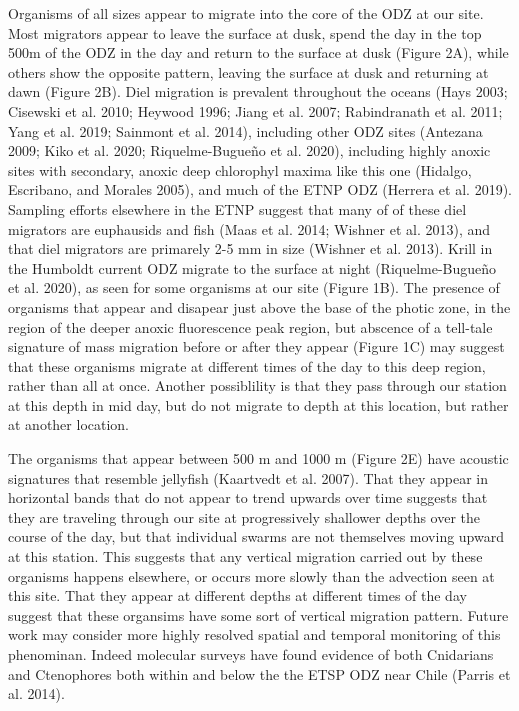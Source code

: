 \documentclass[]{article}
\begin{document}
Organisms of all sizes appear to migrate into the core of the ODZ at our
site. Most migrators appear to leave the surface at dusk, spend the day
in the top 500m of the ODZ in the day and return to the surface at dusk
(Figure 2A), while others show the opposite pattern, leaving the surface
at dusk and returning at dawn (Figure 2B). Diel migration is prevalent
throughout the oceans (Hays 2003; Cisewski et al. 2010; Heywood 1996;
Jiang et al. 2007; Rabindranath et al. 2011; Yang et al. 2019; Sainmont
et al. 2014), including other ODZ sites (Antezana 2009; Kiko et al.
2020; Riquelme-Bugueño et al. 2020), including highly anoxic sites with
secondary, anoxic deep chlorophyl maxima like this one (Hidalgo,
Escribano, and Morales 2005), and much of the ETNP ODZ (Herrera et al.
2019). Sampling efforts elsewhere in the ETNP suggest that many of of
these diel migrators are euphausids and fish (Maas et al. 2014; Wishner
et al. 2013), and that diel migrators are primarely 2-5 mm in size
(Wishner et al. 2013). Krill in the Humboldt current ODZ migrate to the
surface at night (Riquelme-Bugueño et al. 2020), as seen for some
organisms at our site (Figure 1B). The presence of organisms that appear
and disapear just above the base of the photic zone, in the region of
the deeper anoxic fluorescence peak region, but abscence of a tell-tale
signature of mass migration before or after they appear (Figure 1C) may
suggest that these organisms migrate at different times of the day to
this deep region, rather than all at once. Another possiblility is that
they pass through our station at this depth in mid day, but do not
migrate to depth at this location, but rather at another location.

The organisms that appear between 500 m and 1000 m (Figure 2E) have
acoustic signatures that resemble jellyfish (Kaartvedt et al. 2007).
That they appear in horizontal bands that do not appear to trend upwards
over time suggests that they are traveling through our site at
progressively shallower depths over the course of the day, but that
individual swarms are not themselves moving upward at this station. This
suggests that any vertical migration carried out by these organisms
happens elsewhere, or occurs more slowly than the advection seen at this
site. That they appear at different depths at different times of the day
suggest that these organsims have some sort of vertical migration
pattern. Future work may consider more highly resolved spatial and
temporal monitoring of this phenominan. Indeed molecular surveys have
found evidence of both Cnidarians and Ctenophores both within and below
the the ETSP ODZ near Chile (Parris et al. 2014).
\end{document}
